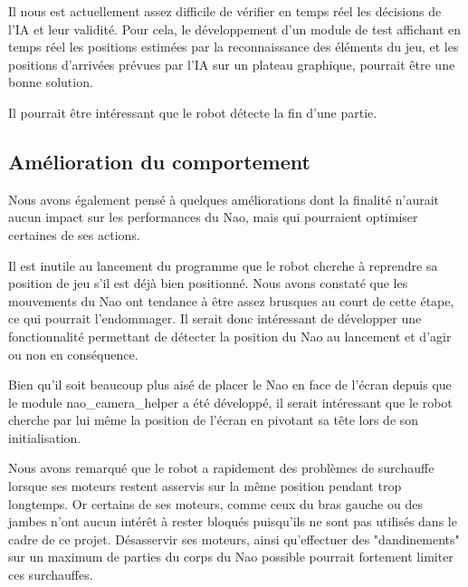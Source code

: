     \par Il nous est actuellement assez difficile de vérifier en temps réel les décisions de l'IA et leur validité.
    Pour cela, le développement d'un module de test affichant en temps réel les positions estimées par la reconnaissance des éléments du jeu, et les positions d'arrivées prévues par l'IA sur un plateau graphique, pourrait être une bonne solution.

    \par Il pourrait être intéressant que le robot détecte la fin d'une partie.


  \subsection{Amélioration du comportement}
  \label{sub:Amélioration du comportement}
    \par Nous avons également pensé à quelques améliorations dont la finalité n'aurait aucun impact sur les performances du Nao, mais qui pourraient optimiser certaines de ses actions.

    \par Il est inutile au lancement du programme que le robot cherche à reprendre sa position de jeu s'il est déjà bien positionné.
    Nous avons constaté que les mouvements du Nao ont tendance à être assez brusques au court de cette étape, ce qui pourrait l'endommager.
    Il serait donc intéressant de développer une fonctionnalité permettant de détecter la position du Nao au lancement et d'agir ou non en conséquence.

    \par Bien qu'il soit beaucoup plus aisé de placer le Nao en face de l'écran depuis que le module nao\_camera\_helper a été développé,
    il serait intéressant que le robot cherche par lui même la position de l'écran en pivotant sa tête lors de son initialisation.

    \par Nous avons remarqué que le robot a rapidement des problèmes de surchauffe lorsque ses moteurs restent asservis sur la même position pendant trop longtemps.
    Or certains de ses moteurs, comme ceux du bras gauche ou des jambes n'ont aucun intérêt à rester bloqués puisqu'ils ne sont pas utilisés dans le cadre de ce projet.
    Désasservir ses moteurs, ainsi qu'effectuer des "dandinements" sur un maximum de parties du corps du Nao possible pourrait fortement limiter ces surchauffes.
\pagebreak
